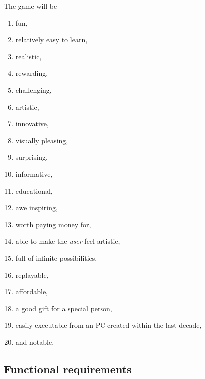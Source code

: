 \vspace{4mm}
The game will be
\begin{enumerate}

  \item fun,

  \item relatively easy to learn,

  \item realistic,

  \item rewarding,

  \item challenging,
  
  \item artistic,
  
  \item innovative,
  
  \item visually pleasing,
  
  \item surprising,
  
  \item informative,
  
  \item educational,
  
  \item awe inspiring,
  
  \item worth paying money for,
  
  \item able to make the \emph{user} feel artistic,
  
  \item full of infinite possibilities,

  \item replayable,

  \item affordable,

  \item a good gift for a special person,

  \item easily executable from an PC created within the last decade,

  \item and notable.

\end{enumerate}

\subsection*{Functional requirements}

